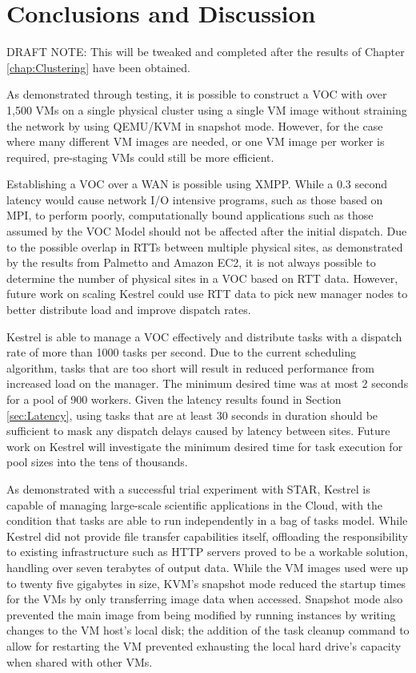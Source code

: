 \chapter{Conclusions and Discussion}
\label{chap:Conclusions}

DRAFT NOTE: This will be tweaked and completed after the results of Chapter
\ref{chap:Clustering} have been obtained.

As demonstrated through testing, it is possible to construct a VOC with over
1,500 VMs on a single physical cluster using a single VM image without straining
the network by using QEMU/KVM in snapshot mode. However, for the case where
many different VM images are needed, or one VM image per worker is required,
pre-staging VMs could still be more efficient.

Establishing a VOC over a WAN is possible using XMPP. While a 0.3 second latency
would cause network I/O intensive programs, such as those based on MPI, to
perform poorly, computationally bound applications such as those assumed by the
VOC Model should not be affected after the initial dispatch. Due to the possible
overlap in RTTs between multiple physical sites, as demonstrated by the results
from Palmetto and Amazon EC2, it is not always possible to determine the number
of physical sites in a VOC based on RTT data. However, future work on scaling
Kestrel could use RTT data to pick new manager nodes to better distribute load
and improve dispatch rates.

Kestrel is able to manage a VOC effectively and distribute tasks with a
dispatch rate of more than 1000 tasks per second. Due to the current scheduling
algorithm, tasks that are too short will result in reduced performance
from increased load on the manager. The minimum desired time was at most 2
seconds for a pool of 900 workers. Given the latency results found in Section
\ref{sec:Latency}, using tasks that are at least 30 seconds in duration should
be sufficient to mask any dispatch delays caused by latency between sites.
Future work on Kestrel will investigate the minimum desired time for task
execution for pool sizes into the tens of thousands.

As demonstrated with a successful trial experiment with STAR, Kestrel is
capable of managing large-scale scientific applications in the Cloud, with the
condition that tasks are able to run independently in a bag of tasks model.
While Kestrel did not provide file transfer capabilities itself, offloading
the responsibility to existing infrastructure such as HTTP servers proved to
be a workable solution, handling over seven terabytes of output data. While
the VM images used were up to twenty five gigabytes in size, KVM's snapshot
mode reduced the startup times for the VMs by only transferring image data when
accessed. Snapshot mode also prevented the main image from being modified by
running instances by writing changes to the VM host's local disk; the addition
of the task cleanup command to allow for restarting the VM prevented exhausting
the local hard drive's capacity when shared with other VMs.
